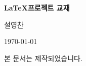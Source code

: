 \begin{titlepage}
  \centering
  \vspace*{4cm}
  
  {\Huge \textbf{\LaTeX 프로젝트 교재}} \par
  \vspace{2cm}
  
  {\Large 설영찬} \par
  \vspace{1cm}
  
  {\large \today} \par
  \vfill %
  
  {\small 본 문서는  제작되었습니다.}
\end{titlepage}

\clearpage %